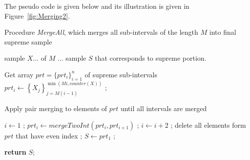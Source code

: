 \documentclass[12pt, a4paper]{article}
\def\lc{\left\lceil}
\def\rc{\right\rceil}
\numberwithin{equation}{section}
\begin{document}
The pseudo code is given below and its illustration is given in Figure~\ref{fig:Merging2}.

\begin{algorithm}[H]
\caption{Procedure \emph{MergeAll}, which merges all
sub-intervals of the length $M$ into final supreme sample}
\label{alg:MergeAll}
\begin{algorithmic}[1]
\Require sample $X$... of $M$ ...
\Output sample $S$ that corresponds to supreme portion.
\item[]
\item[]
\Comment Get array $prt = \{prt_i\}_{i=1}^n$ of supreme sub-intervals
\For{$i \leftarrow 1$ \textbf{ to } $\lc counter(X)/M \rc$}
  \State $prt_i \leftarrow 
    \left\{ X_j \right\}_{j=M(i-1)}^{\min(Mi, counter(X))}$ ;
\EndFor
\item[]
\item[] \Comment Apply pair merging to elements of $prt$ until all intervals are merged

\State $i \leftarrow 1$ ;
    \State $prt_i \leftarrow mergeTwoInt(prt_i, prt_{i+1}) $ ;
    \State $i \leftarrow i+2$ ;  
  \EndWhile
  delete all elements form $prt$ that have even index ;
\EndWhile
\State $S \leftarrow prt_1 $ ;

\State \textbf{return} $S$;
\EndFunction
\end{algorithmic}
\end{algorithm}

%
%  
%  
%  
\end{document}

